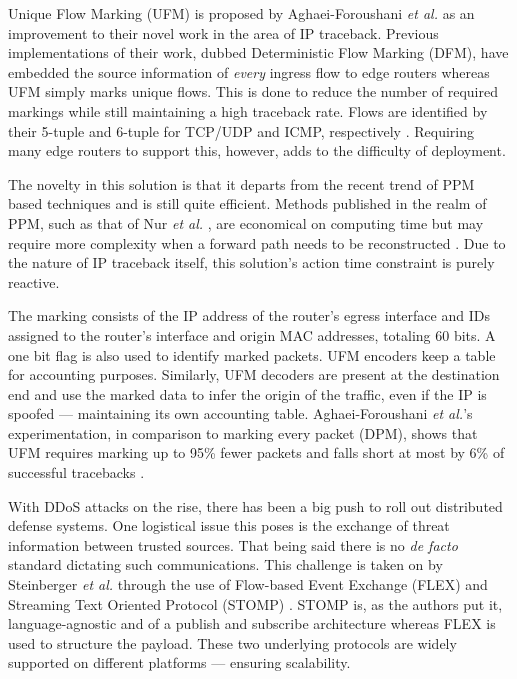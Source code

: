 \documentclass[conference]{IEEEtran}
\begin{document}
Unique Flow Marking (UFM) is proposed by Aghaei-Foroushani \textit{et al.} as an improvement to their novel work in the area of IP traceback. Previous implementations of their work, dubbed Deterministic Flow Marking (DFM), have embedded the source information of \textit{every} ingress flow to edge routers whereas UFM simply marks unique flows. This is done to reduce the number of required markings while still maintaining a high traceback rate. Flows are identified by their 5-tuple and 6-tuple for TCP/UDP and ICMP, respectively \cite{Aghaei:UFM}. Requiring many edge routers to support this, however, adds to the difficulty of deployment. 

The novelty in this solution is that it departs from the recent trend of PPM based techniques and is still quite efficient. Methods published in the realm of PPM, such as that of Nur \textit{et al.} \cite{Nur:CyPhy}, are economical on computing time but may require more complexity when a forward path needs to be reconstructed \cite{Aghaei:UFM}. Due to the nature of IP traceback itself, this solution's action time constraint is purely reactive.

The marking consists of the IP address of the router's egress interface and IDs assigned to the router's interface and origin MAC addresses, totaling 60 bits. A one bit flag is also used to identify marked packets. UFM encoders keep a table for accounting purposes. Similarly, UFM decoders are present at the destination end and use the marked data to infer the origin of the traffic, even if the IP is spoofed --- maintaining its own accounting table. Aghaei-Foroushani \textit{et al.}'s experimentation, in comparison to marking every packet (DPM), shows that UFM requires marking up to 95\% fewer packets and falls short at most by 6\% of successful tracebacks \cite{Aghaei:UFM}.

With DDoS attacks on the rise, there has been a big push to roll out distributed defense systems. One logistical issue this poses is the exchange of threat information between trusted sources. That being said there is no \textit{de facto} standard dictating such communications. This challenge is taken on by Steinberger \textit{et al.} through the use of Flow-based Event Exchange (FLEX) and Streaming Text Oriented Protocol (STOMP) \cite{Steinberger:FLEX}. STOMP is, as the authors put it, language-agnostic and of a publish and subscribe architecture whereas FLEX is used to structure the payload. These two underlying protocols are widely supported on different platforms --- ensuring scalability. 
\end{document}
